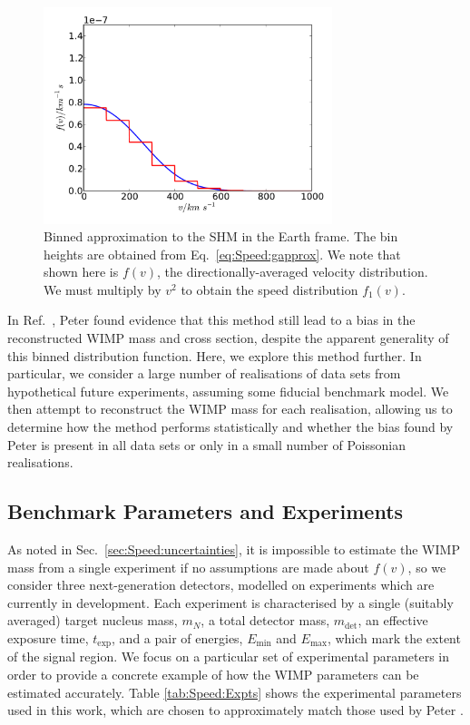 \begin{figure}[h]
\centering
  \includegraphics[width=0.75\textwidth]{Speed/BinnedApprox.pdf}
  \caption[Binned approximation to the SHM]{Binned approximation to the SHM in the Earth frame. The bin heights are obtained from Eq.~\ref{eq:Speed:gapprox}. We note that shown here is $f(v)$, the directionally-averaged velocity distribution. We must multiply by $v^2$ to obtain the speed distribution $f_1(v)$.}
  \label{fig:Speed:BinApprox}
\end{figure}

In Ref.~\cite{Peter:2011}, Peter found evidence that this method still lead to a bias in the reconstructed WIMP mass and cross section, despite the apparent generality of this binned distribution function. Here, we explore this method further. In particular, we consider a large number of realisations of data sets from hypothetical future experiments, assuming some fiducial benchmark model. We then attempt to reconstruct the WIMP mass for each realisation, allowing us to determine how the method performs statistically and whether the bias found by Peter is present in all data sets or only in a small number of Poissonian realisations.

\subsection{Benchmark Parameters and Experiments}
\label{sec:Speed:Experiments}
As noted in Sec.~\ref{sec:Speed:uncertainties}, it is impossible to estimate the WIMP mass from a single experiment if no assumptions are made about \(f(v)\), so we consider three next-generation detectors, modelled on experiments which are currently in development. Each experiment is characterised by a single (suitably averaged) target nucleus mass, \(m_N\), a total detector mass, \(m_\textrm{det}\), an effective exposure time, \(t_\textrm{exp}\), and a pair of energies, \(E_\textrm{min}\) and \(E_\textrm{max}\), which mark the extent of the signal region. We focus on a particular set of experimental parameters in order to provide a concrete example of how the WIMP parameters can be estimated accurately. Table \ref{tab:Speed:Expts} shows the experimental parameters used in this work, which are chosen to approximately match those used by Peter \cite{Peter:2011}.

